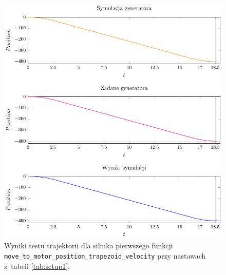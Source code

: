 \documentclass[a4paper, 12pt]{article}
\begin{document}
	\begin{figure}[H]
		\centering
		\includegraphics[scale=1.2]{raport_graphs/simpMPVrevers.pdf}
		\caption{Wyniki testu trajektorii dla silnika pierwszego funkcji \texttt{move\_to\_motor\_position\_trapezoid\_velocity} przy nastawach z~tabeli \ref{tab:setup1}.}
		\label{fig:simpMPVrevers}
	\end{figure}
		
\end{document}
